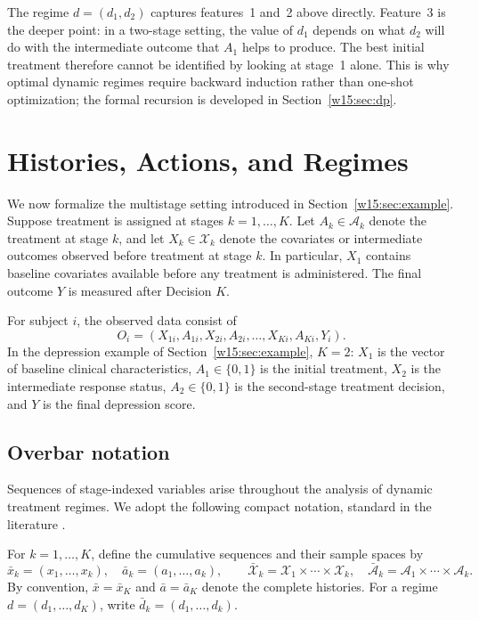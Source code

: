 \documentclass[master.tex]{subfiles}
\begin{document}
The regime $d = (d_1, d_2)$ captures features~1 and~2 above directly. Feature~3 is the deeper point: in a two-stage setting, the value of $d_1$ depends on what $d_2$ will do with the intermediate outcome that $A_1$ helps to produce. The best initial treatment therefore cannot be identified by looking at stage~1 alone. This is why optimal dynamic regimes require backward induction rather than one-shot optimization; the formal recursion is developed in Section~\ref{w15:sec:dp}.

\section{Histories, Actions, and Regimes}
\label{w15:sec:setup}

We now formalize the multistage setting introduced in Section~\ref{w15:sec:example}. Suppose treatment is assigned at stages $k = 1,\ldots,K$. Let $A_k \in \mathcal{A}_k$ denote the treatment at stage $k$, and let $X_k \in \mathcal{X}_k$ denote the covariates or intermediate outcomes observed before treatment at stage $k$. In particular, $X_1$ contains baseline covariates available before any treatment is administered. The final outcome $Y$ is measured after Decision $K$.

For subject $i$, the observed data consist of
\[
O_i = (X_{1i},A_{1i},X_{2i},A_{2i},\ldots,X_{Ki},A_{Ki},Y_i).
\]
In the depression example of Section~\ref{w15:sec:example}, $K = 2$: $X_1$ is the vector of baseline clinical characteristics, $A_1 \in \{0,1\}$ is the initial treatment, $X_2$ is the intermediate response status, $A_2 \in \{0,1\}$ is the second-stage treatment decision, and $Y$ is the final depression score.

\subsection{Overbar notation}

Sequences of stage-indexed variables arise throughout the analysis of dynamic treatment regimes. We adopt the following compact notation, standard in the literature \citep{robins1986new}.

For $k = 1,\ldots,K$, define the cumulative sequences and their sample spaces by
\[
\bar{x}_k = (x_1,\ldots,x_k), \quad \bar{a}_k = (a_1,\ldots,a_k),
\qquad
\bar{\mathcal{X}}_k = \mathcal{X}_1\times\cdots\times\mathcal{X}_k, \quad \bar{\mathcal{A}}_k = \mathcal{A}_1\times\cdots\times\mathcal{A}_k.
\]
By convention, $\bar{x} = \bar{x}_K$ and $\bar{a} = \bar{a}_K$ denote the complete histories. For a regime $d = (d_1,\ldots,d_K)$, write $\bar{d}_k = (d_1,\ldots,d_k)$.
\end{document}

